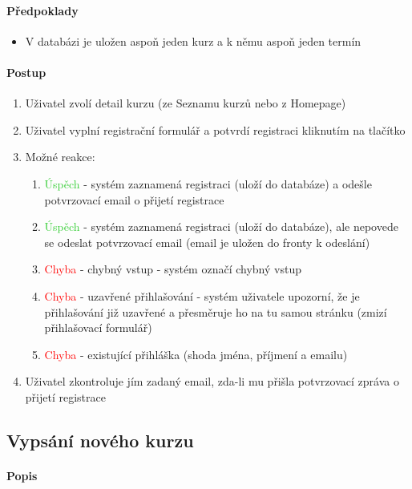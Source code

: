 \documentclass[12pt,a4paper,titlepage,final]{report}
\begin{document}
\paragraph{Předpoklady}

\begin{itemize}
	\item V databázi je uložen aspoň jeden kurz a k němu aspoň jeden termín
\end{itemize}

\paragraph{Postup}
\begin{enumerate}
	\item Uživatel zvolí detail kurzu (ze Seznamu kurzů nebo z Homepage)
	\item Uživatel vyplní registrační formulář a potvrdí registraci kliknutím na tlačítko
	\item Možné reakce:
	\begin{enumerate}
		\item \textcolor{LimeGreen}{Úspěch} - systém zaznamená registraci (uloží do databáze) a odešle potvrzovací email o přijetí registrace
		\item \textcolor{LimeGreen}{Úspěch} - systém zaznamená registraci (uloží do databáze), ale nepovede se odeslat potvrzovací email (email je uložen do fronty k odeslání)
		\item \textcolor{Red}{Chyba} - chybný vstup - systém označí chybný vstup
		\item \textcolor{Red}{Chyba} - uzavřené přihlašování - systém uživatele upozorní, že je přihlašování již uzavřené a přesměruje ho na tu samou stránku (zmizí přihlašovací formulář)
		\item \textcolor{Red}{Chyba} - existující přihláška (shoda jména, příjmení a emailu)
	\end{enumerate}
	\item Uživatel zkontroluje jím zadaný email, zda-li mu přišla potvrzovací zpráva o přijetí registrace
\end{enumerate}


\subsection{Vypsání nového kurzu}

\paragraph{Popis}
\end{document}
